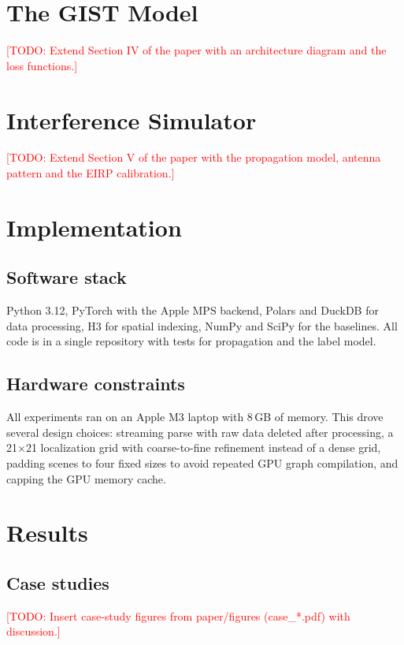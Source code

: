 \documentclass[12pt,a4paper,oneside]{report}
\newcommand{\todo}[1]{\textcolor{red}{[TODO: #1]}}
\begin{document}
\chapter{The GIST Model}
\todo{Extend Section IV of the paper with an architecture diagram and the loss functions.}

\chapter{Interference Simulator}
\todo{Extend Section V of the paper with the propagation model, antenna pattern and the EIRP calibration.}

\chapter{Implementation}
\section{Software stack}
Python 3.12, PyTorch with the Apple MPS backend, Polars and DuckDB for data processing, H3 for spatial indexing, NumPy and
SciPy for the baselines. All code is in a single repository with tests for propagation and the label model.
\section{Hardware constraints}
All experiments ran on an Apple M3 laptop with 8\,GB of memory. This drove several design choices: streaming parse with raw
data deleted after processing, a 21$\times$21 localization grid with coarse-to-fine refinement instead of a dense grid,
padding scenes to four fixed sizes to avoid repeated GPU graph compilation, and capping the GPU memory cache.

\chapter{Results}


\section{Case studies}
\todo{Insert case-study figures from paper/figures (case\_*.pdf) with discussion.}
\end{document}
